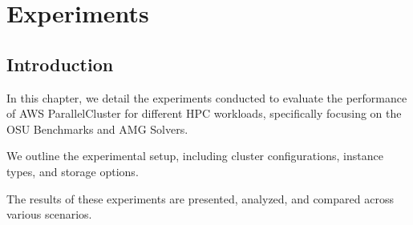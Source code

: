 

\chapter{Experiments}

\section{Introduction}

In this chapter, we detail the experiments conducted to evaluate the performance of AWS ParallelCluster for different HPC workloads, specifically focusing on the OSU Benchmarks and AMG Solvers. 

We outline the experimental setup, including cluster configurations, instance types, and storage options. 

The results of these experiments are presented, analyzed, and compared across various scenarios.
